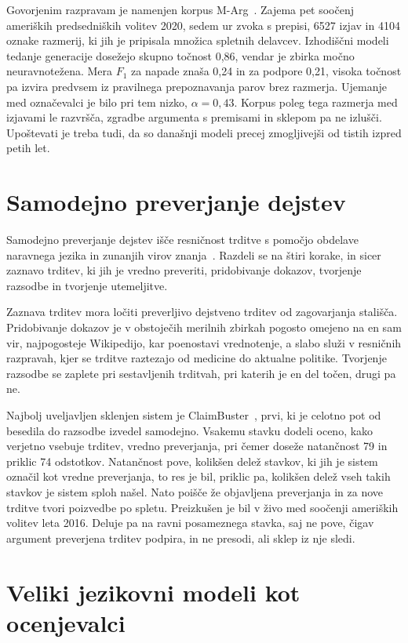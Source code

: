\documentclass[a4paper, 12pt]{book}
\begin{document}
Govorjenim razpravam je namenjen korpus M-Arg~\cite{mestre2021marg}. Zajema pet
soočenj ameriških predsedniških volitev 2020, sedem ur zvoka s prepisi, 6527
izjav in 4104 oznake razmerij, ki jih je pripisala množica spletnih delavcev.
Izhodiščni modeli tedanje generacije dosežejo skupno točnost 0,86, vendar je
zbirka močno neuravnotežena. Mera $F_1$ za napade znaša 0,24 in za podpore 0,21,
visoka točnost pa izvira predvsem iz pravilnega prepoznavanja parov brez
razmerja. Ujemanje med označevalci je bilo pri tem nizko, $\alpha = 0{,}43$.
Korpus poleg tega razmerja med izjavami le razvršča, zgradbe argumenta s
premisami in sklepom pa ne izlušči. Upoštevati je treba tudi, da so današnji
modeli precej zmogljivejši od tistih izpred petih let.


\section{Samodejno preverjanje dejstev}
\label{sec:fact-checking-sorodna}
Samodejno preverjanje dejstev išče resničnost trditve s pomočjo obdelave
naravnega jezika in zunanjih virov znanja~\cite{guo2022survey}. Razdeli se na
štiri korake, in sicer zaznavo trditev, ki jih je vredno preveriti, pridobivanje
dokazov, tvorjenje razsodbe in tvorjenje utemeljitve.

Zaznava trditev mora ločiti preverljivo dejstveno trditev od zagovarjanja
stališča. Pridobivanje dokazov je v obstoječih merilnih zbirkah pogosto omejeno
na en sam vir, najpogosteje Wikipedijo, kar poenostavi vrednotenje, a slabo
služi v resničnih razpravah, kjer se trditve raztezajo od medicine do aktualne
politike. Tvorjenje razsodbe se zaplete pri sestavljenih trditvah, pri katerih
je en del točen, drugi pa ne.

Najbolj uveljavljen sklenjen sistem je ClaimBuster~\cite{hassan2017claimbuster},
prvi, ki je celotno pot od besedila do razsodbe izvedel samodejno. Vsakemu
stavku dodeli oceno, kako verjetno vsebuje trditev, vredno preverjanja, pri
čemer doseže natančnost 79 in priklic 74 odstotkov. Natančnost pove, kolikšen
delež stavkov, ki jih je sistem označil kot vredne preverjanja, to res je bil,
priklic pa, kolikšen delež vseh takih stavkov je sistem sploh našel. Nato poišče
že objavljena preverjanja in za nove trditve tvori poizvedbe po spletu.
Preizkušen je bil v živo med soočenji ameriških volitev leta 2016. Deluje pa na
ravni posameznega stavka, saj ne pove, čigav argument preverjena trditev
podpira, in ne presodi, ali sklep iz nje sledi.


\section{Veliki jezikovni modeli kot ocenjevalci}
\label{sec:llm-judge}
\end{document}
